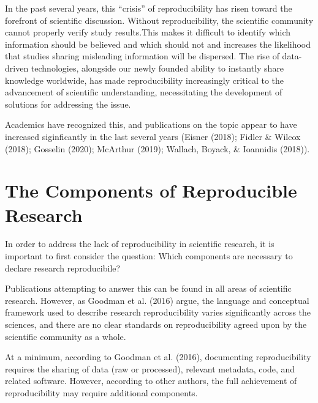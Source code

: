 \documentclass[12pt,twoside]{reedthesis}
\begin{document}
In the past several years, this ``crisis'' of reproducibility has risen
toward the forefront of scientific discussion. Without reproducibility,
the scientific community cannot properly verify study results.This makes
it difficult to identify which information should be believed and which
should not and increases the likelihood that studies sharing misleading
information will be dispersed. The rise of data-driven technologies,
alongside our newly founded ability to instantly share knowledge
worldwide, has made reproducibility increasingly critical to the
advancement of scientific understanding, necessitating the development
of solutions for addressing the issue.

Academics have recognized this, and publications on the topic appear to
have increased siginficantly in the last several years (Eisner (2018);
Fidler \& Wilcox (2018); Gosselin (2020); McArthur (2019); Wallach,
Boyack, \& Ioannidis (2018)).

\section{The Components of Reproducible
Research}\label{the-components-of-reproducible-research}

In order to address the lack of reproducibility in scientific research,
it is important to first consider the question: Which components are
necessary to declare research reproducibile?

Publications attempting to answer this can be found in all areas of
scientific research. However, as Goodman et al. (2016) argue, the
language and conceptual framework used to describe research
reproducibility varies significantly across the sciences, and there are
no clear standards on reproducibility agreed upon by the scientific
community as a whole.

At a minimum, according to Goodman et al. (2016), documenting
reproducibility requires the sharing of data (raw or processed),
relevant metadata, code, and related software. However, according to
other authors, the full achievement of reproducibility may require
additional components.
\end{document}
